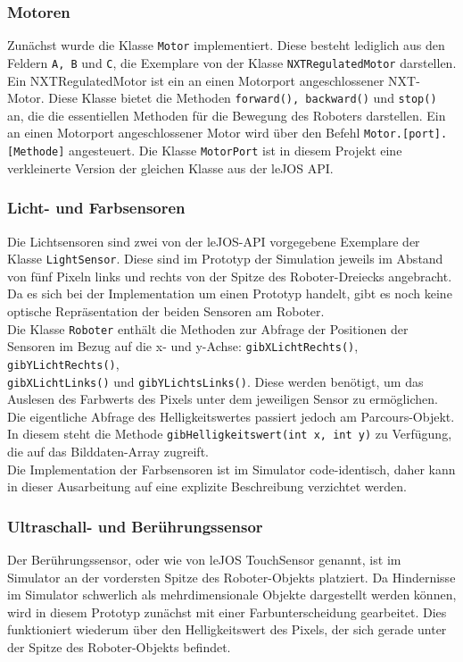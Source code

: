 \documentclass[paper=a4, pagesize, DIV=calc, BCOR=12.5mm, twoside=on, onecolumn=on, open = any, titlepage =on, parskip =half-, headsepline = on, footsepline = on, chapterprefix = on, appendixprefix = off, fontsize = 12pt, numbers = noenddot, abstract = on]{scrbook}
\numberwithin{equation}{chapter}
\theoremstyle{definition}
\theoremstyle{plain}
\theoremstyle{plain}
\theoremstyle{remark}
\theoremstyle{plain}
\theoremstyle{plain}
\begin{document}
\subsubsection{Motoren}
Zunächst wurde die Klasse \texttt{Motor} implementiert. Diese besteht lediglich aus den Feldern \texttt{A, B} und \texttt{C}, die Exemplare von der Klasse \texttt{NXTRegulatedMotor} darstellen. Ein NXTRegulatedMotor ist ein an einen Motorport angeschlossener NXT-Motor. Diese Klasse bietet die Methoden \texttt{forward(), backward()} und \texttt{stop()} an, die die essentiellen Methoden für die Bewegung des Roboters darstellen. Ein an einen Motorport angeschlossener Motor wird über den Befehl \texttt{Motor.[port].[Methode]} angesteuert. Die Klasse \texttt{MotorPort} ist in diesem Projekt eine verkleinerte Version der gleichen Klasse aus der leJOS API.
\subsubsection{Licht- und Farbsensoren}
Die Lichtsensoren sind zwei von der leJOS-API vorgegebene Exemplare der Klasse \texttt{LightSensor}. Diese sind im Prototyp der Simulation jeweils im Abstand von fünf Pixeln links und rechts von der Spitze des Roboter-Dreiecks angebracht. Da es sich bei der Implementation um einen Prototyp handelt, gibt es noch keine optische Repräsentation der beiden Sensoren am Roboter.\\

Die Klasse \texttt{Roboter} enthält die Methoden zur Abfrage der Positionen der Sensoren im Bezug auf die x- und y-Achse: \texttt{gibXLichtRechts()}, \texttt{gibYLichtRechts()},\\
\texttt{gibXLichtLinks()} und \texttt{gibYLichtsLinks()}. Diese werden benötigt, um das Auslesen des Farbwerts des Pixels unter dem jeweiligen Sensor zu ermöglichen. Die eigentliche Abfrage des Helligkeitswertes passiert jedoch am Parcours-Objekt. In diesem steht die Methode \texttt{gibHelligkeitswert(int x, int y)} zu Verfügung, die auf das Bilddaten-Array zugreift.\\

Die Implementation der Farbsensoren ist im Simulator code-identisch, daher kann in dieser Ausarbeitung auf eine explizite Beschreibung verzichtet werden.
\subsubsection{Ultraschall- und Berührungssensor}
Der Berührungssensor, oder wie von leJOS TouchSensor genannt, ist im Simulator an der vordersten Spitze des Roboter-Objekts platziert. Da Hindernisse im Simulator schwerlich als mehrdimensionale Objekte dargestellt werden können, wird in diesem Prototyp zunächst mit einer Farbunterscheidung gearbeitet. Dies funktioniert wiederum über den Helligkeitswert des Pixels, der sich gerade unter der Spitze des Roboter-Objekts befindet.\\
\end{document}

